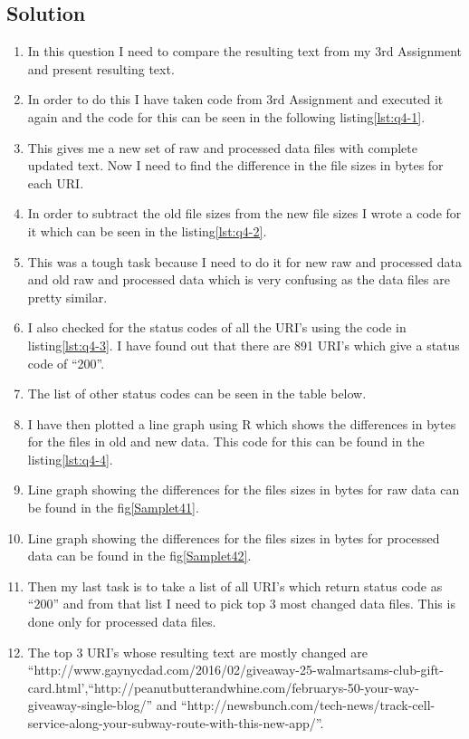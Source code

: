 \subsection{Solution}
\begin{enumerate}

\item In this question I need to compare the resulting text from my 3rd Assignment and present resulting text.
\item In order to do this I have taken code from 3rd Assignment and executed it again and the code for this can be seen in the following listing\ref{lst:q4-1}.
\item This gives me a new set of raw and processed data files with complete updated text. Now I need to find the difference in the file sizes in bytes for each URI.
\item In order to subtract the old file sizes from the new file sizes I wrote a code for it which can be seen in the listing\ref{lst:q4-2}. 
\item This was a tough task because I need to do it for new raw and processed data and old raw and processed data which is very confusing as the data files are pretty similar.
\item I also checked for the status codes of all the URI's using the code in listing\ref{lst:q4-3}. I have found out that there are 891 URI's which give a status code of ``200''.
\item The list of other status codes can be seen in the table below.
\item I have then plotted a line graph using R which shows the differences in bytes for the files in old and new data. This code for this can be found in the listing\ref{lst:q4-4}.
\item Line graph showing the differences for the files sizes in bytes for raw data can be found in the fig\ref{Samplet41}.
\item Line graph showing the differences for the files sizes in bytes for processed data can be found in the fig\ref{Samplet42}.
\item Then my last task is to take a list of all URI's which return status code as ``200'' and from that list I need to pick top 3 most changed data files. This is done only for processed data files.
\item The top 3 URI's whose resulting text are mostly changed are ``http://www.gaynycdad.com/2016/02/giveaway-25-walmartsams-club-gift-card.html',``http://peanutbutterandwhine.com/februarys-50-your-way-giveaway-single-blog/'' and ``http://newsbunch.com/tech-news/track-cell-service-along-your-subway-route-with-this-new-app/''.

\end{enumerate}

